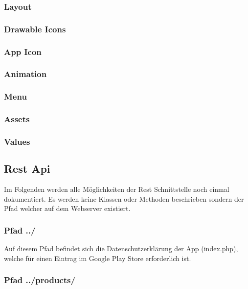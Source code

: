\documentclass{scrartcl}
\begin{document}
\subsubsection{Layout}

\subsubsection{Drawable Icons}

\subsubsection{App Icon}

\subsubsection{Animation}

\subsubsection{Menu}

\subsubsection{Assets}

\subsubsection{Values}

\newpage

\subsection{Rest Api}
Im Folgenden werden alle Möglichkeiten der Rest Schnittstelle noch einmal dokumentiert. Es werden keine Klassen oder Methoden beschrieben sondern der Pfad welcher auf dem Webserver existiert.

\subsubsection{Pfad ../}

Auf diesem Pfad befindet sich die Datenschutzerklärung der App (index.php), welche für einen Eintrag im Google Play Store erforderlich ist.

\subsubsection{Pfad ../products/}
\end{document}
